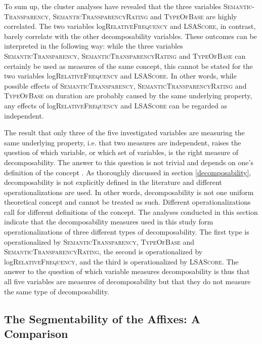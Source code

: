 To sum up, the cluster analyses have revealed that the three variables \textsc{Semantic-Transparency}, \textsc{SemanticTransparencyRating} and \textsc{TypeOfBase} are highly correlated. The two variables log\textsc{RelativeFrequency} and \textsc{LSAScore}, in contrast, barely correlate with the other decomposability variables.
These outcomes can be interpreted in the following way: while the three variables  \textsc{SemanticTransparency}, \textsc{SemanticTransparencyRating} and \textsc{TypeOfBase} can certainly be used as measures of the same concept, this cannot be stated for the two variables log\textsc{RelativeFrequency} and \textsc{LSAScore}. In other words,  while possible effects of \textsc{SemanticTransparency}, \textsc{SemanticTransparencyRating} and \textsc{TypeOfBase} on duration are probably caused by the same underlying property, any effects of log\textsc{RelativeFrequency} and \textsc{LSAScore} can be regarded as independent.


The result that only three of the five investigated variables are measuring the same underlying property, i.e. that two measures are independent, raises the question of which variable, or which set of variables, is the right measure of decomposability.
The answer to this question is not trivial and depends on one's definition of the concept . As thoroughly discussed in section \ref{decomposability}, decomposability is not explicitly defined in the literature and different operationalizations are used. In other words, decomposability is not one uniform theoretical concept and cannot be treated as such. Different operationalizations call for different definitions of the concept. 
The analyses conducted in this section indicate that the decomposability measures used in this study form operationalizations of three different types of decomposability. The first type is operationalized by \textsc{SemanticTransparency}, \textsc{TypeOfBase} and \textsc{SemanticTransparencyRating}, the second is operationalized by log\textsc{RelativeFrequency}, and the third is operationalized by \textsc{LSAScore}.
The answer to the question of which variable measures decomposability is thus that all five variables are measures of decomposability but that they do not measure the same type of decomposability. 

 

\subsection{The Segmentability of the Affixes: A Comparison}
\label{The decomposability of the four affixes: a comparison}

